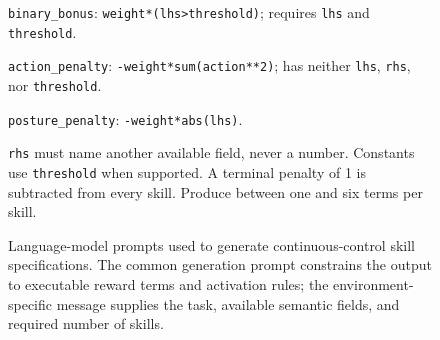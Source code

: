 \documentclass[conference,letterpaper,10pt]{IEEEtran}
\begin{document}
\begin{figure}[!t]
{\begin{minipage}{0.94\textwidth}
\texttt{binary\_bonus}: \texttt{weight*(lhs>threshold)};
requires \texttt{lhs} and \texttt{threshold}.

\texttt{action\_penalty}: \texttt{-weight*sum(action**2)};
has neither \texttt{lhs}, \texttt{rhs}, nor \texttt{threshold}.

\texttt{posture\_penalty}: \texttt{-weight*abs(lhs)}.

\texttt{rhs} must name another available field, never a number. Constants use
\texttt{threshold} when supported. A terminal penalty of 1 is subtracted from every skill.
Produce between one and six terms per skill.
\end{minipage}
}

\vspace{7pt}

\begin{minipage}[t]{0.455\textwidth}
\end{minipage}
\hfill
\begin{minipage}[t]{0.455\textwidth}
\end{minipage}

\caption{Language-model prompts used to generate continuous-control skill specifications. The common generation prompt constrains the output to executable reward terms and activation rules; the environment-specific message supplies the task, available semantic fields, and required number of skills.}
\label{fig:llmprompts}
\end{figure}
\end{document}
